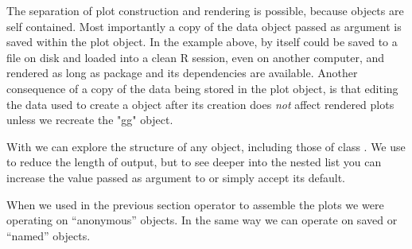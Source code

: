 \documentclass[krantz2]{krantz}\usepackage{knitr}%
\begin{document}
\begin{knitrout}\footnotesize
{}\color{fgcolor}\begin{kframe}
\begin{alltt}
 \hlkwb{<-} \hlstd{(} 
       \hlstd{(}    \hlopt{+}
  \hlstd{()}
\end{alltt}
\end{kframe}
\end{knitrout}

\begin{warningbox}
  The separation of plot construction and rendering is possible, because  objects are self contained. Most importantly a copy of the data object passed as argument is saved within the plot object. In the example above,  by itself could be saved to a file on disk and loaded into a clean R session, even on another computer, and rendered as long as package \ggplot and its dependencies are available. Another consequence of a copy of the data being stored in the plot object, is that editing the data used to create a  object after its creation does \emph{not} affect rendered plots unless we recreate the "gg" object.

  With  we can explore the structure of any \Rlang object, including those of class . We use  to reduce the length of output, but to see deeper into the nested list you can increase the value passed as argument to  or simply accept its default.

\begin{knitrout}\footnotesize
{}\color{fgcolor}\begin{kframe}
\begin{alltt}
  \hlstd{=} \hlstd{)}
\end{alltt}
\end{kframe}
\end{knitrout}
\end{warningbox}

When we used in the previous section operator \code{+} to assemble the plots we were operating on ``anonymous'' \Rlang objects. In the same way we can operate on saved or ``named'' objects.
\end{document}
